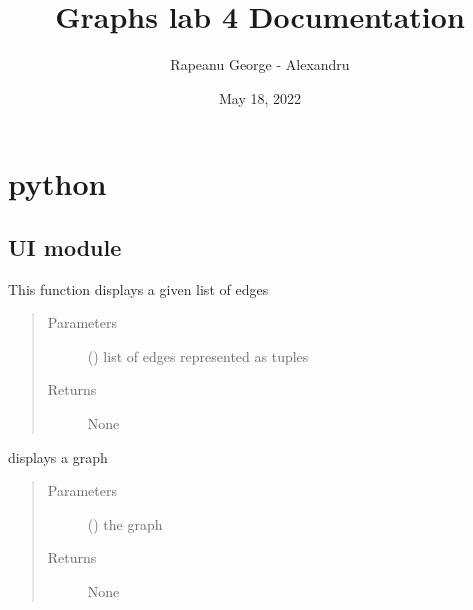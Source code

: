 \documentclass[letterpaper,10pt,english]{sphinxmanual}
\title{Graphs lab 4 Documentation}
\date{May 18, 2022}
\author{Rapeanu George - Alexandru}
\begin{document}
\pagestyle{empty}
\sphinxmaketitle
\pagestyle{plain}
\sphinxtableofcontents
\pagestyle{normal}
\label{\detokenize{index::doc}}



\chapter{python}
\label{\detokenize{modules:python}}\label{\detokenize{modules::doc}}

\section{UI module}
\label{\detokenize{UI:module-UI}}\label{\detokenize{UI:ui-module}}\label{\detokenize{UI::doc}}

\begin{fulllineitems}
\label{\detokenize{UI:UI.display_edges}}
This function displays a given list of edges
\begin{quote}\begin{description}
\item[{Parameters}] \leavevmode
{} () \textendash{} list of edges represented as tuples

\item[{Returns}] \leavevmode
None

\end{description}\end{quote}

\end{fulllineitems}


\begin{fulllineitems}
\label{\detokenize{UI:UI.display_graph}}
displays a graph
\begin{quote}\begin{description}
\item[{Parameters}] \leavevmode
{} ({\hyperref[\detokenize{UndirectedGraph:UndirectedGraph.UndirectedGraph}]{}}) \textendash{} the graph

\item[{Returns}] \leavevmode
None

\end{description}\end{quote}

\end{fulllineitems}
\end{document}
